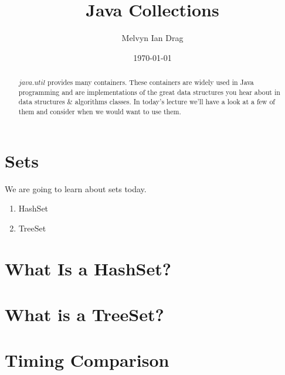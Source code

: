 \documentclass[12pt]{article}
\title{Java Collections}
\author{
	Melvyn Ian Drag
}
\date{\today}
\begin{document}
\maketitle

\begin{abstract}
$java.util$ provides many containers. These containers are widely used in Java programming and are implementations of the great data structures you hear about in data structures \& algorithms classes. In today's lecture we'll have a look at a few of them and consider when we would want to use them.
\end{abstract}

\section{Sets}
We are going to learn about sets today.
\begin{enumerate}
\item HashSet
\item TreeSet
\end{enumerate}

\section{What Is a HashSet?}

\section{What is a TreeSet?}

\section{Timing Comparison}
\end{document}
